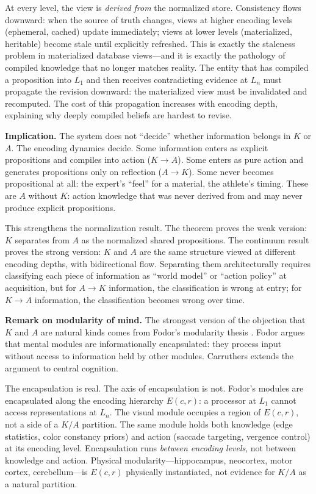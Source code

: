 \documentclass[11pt]{article}
\theoremstyle{definition}
\theoremstyle{remark}
\begin{document}
At every level, the view is \emph{derived from} the normalized store.
Consistency flows downward: when the source of truth changes, views at
higher encoding levels (ephemeral, cached) update immediately; views at
lower levels (materialized, heritable) become stale until explicitly
refreshed. This is exactly the staleness problem in materialized
database views---and it is exactly the pathology of compiled knowledge
that no longer matches reality. The entity that has compiled a
proposition into $L_1$ and then receives contradicting evidence at $L_n$
must propagate the revision downward: the materialized view must be
invalidated and recomputed. The cost of this propagation increases with
encoding depth, explaining why deeply compiled beliefs are hardest to
revise.

\textbf{Implication.} The system does not ``decide'' whether information
belongs in $K$ or $A$. The encoding dynamics decide. Some information
enters as explicit propositions and compiles into action ($K \to A$).
Some enters as pure action and generates propositions only on reflection
($A \to K$). Some never becomes propositional at all: the expert's
``feel'' for a material, the athlete's timing. These are $A$ without
$K$: action knowledge that was never derived from and may never produce
explicit propositions.

This strengthens the normalization result. The theorem proves the weak
version: $K$ separates from $A$ as the normalized shared propositions.
The continuum result proves the strong version: $K$ and $A$ are the same
structure viewed at different encoding depths, with bidirectional flow.
Separating them architecturally requires classifying each piece of
information as ``world model'' or ``action policy'' at acquisition, but
for $A \to K$ information, the classification is wrong at entry; for
$K \to A$ information, the classification becomes wrong over time.

\textbf{Remark on modularity of mind.} The strongest version of the
objection that $K$ and $A$ are natural kinds comes from Fodor's
modularity thesis \cite{Fodor1983}. Fodor argues that mental modules
are informationally encapsulated: they process input without access to
information held by other modules. Carruthers \cite{Carruthers2006}
extends the argument to central cognition.

The encapsulation is real. The axis of encapsulation is not. Fodor's
modules are encapsulated along the encoding hierarchy $E(c,r)$: a
processor at $L_1$ cannot access representations at $L_n$. The visual
module occupies a region of $E(c,r)$, not a side of a $K/A$ partition.
The same module holds both knowledge (edge statistics, color constancy
priors) and action (saccade targeting, vergence control) at its encoding
level. Encapsulation runs \emph{between encoding levels}, not between
knowledge and action. Physical modularity---hippocampus, neocortex,
motor cortex, cerebellum---is $E(c,r)$ physically instantiated, not
evidence for $K/A$ as a natural partition.
\end{document}
